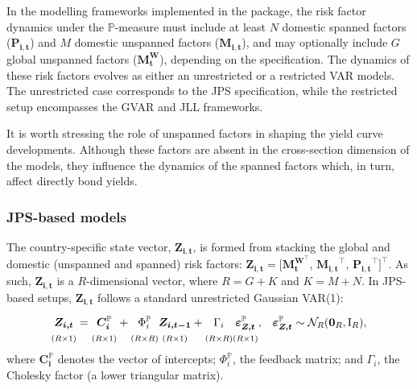 In the modelling frameworks implemented in the  package, the risk factor dynamics under the \(\mathbb{P}\)-measure must include at least \(N\) domestic spanned factors (\(\boldsymbol{P_{i,t}}\)) and \(M\) domestic unspanned factors (\(\boldsymbol{M_{i,t}}\)), and may optionally include \(G\) global unspanned factors (\(\boldsymbol{M_t^W}\)), depending on the specification. The dynamics of these risk factors evolves as either an unrestricted or a restricted VAR models. The unrestricted case corresponds to the JPS specification, while the restricted setup encompasses the GVAR and JLL frameworks.

It is worth stressing the role of unspanned factors in shaping the yield curve developments. Although these factors are absent in the cross-section dimension of the models, they influence the dynamics of the spanned factors which, in turn, affect directly bond yields.

\subsubsection{JPS-based models}\label{jps-based-models}

The country-specific state vector, \(\boldsymbol{Z_{i,t}}\), is formed from stacking the global and domestic (unspanned and spanned) risk factors: \(\boldsymbol{Z_{i,t}} = [\boldsymbol{M_t^{W^\top}}\), \(\boldsymbol{M_{i,t}}^\top\), \(\boldsymbol{P_{i,t}}^\top]^\top\). As such, \(\boldsymbol{Z_{i,t}}\) is a \(R\)-dimensional vector, where \(R =G + K\) and \(K = M + N\).
In JPS-based setups, \(\boldsymbol{Z_{i,t}}\) follows a standard unrestricted Gaussian VAR(1):
\begin{align}
    & \underset{(R \times 1)}{\vphantom{\Big|}
    \boldsymbol{Z_{i,t}}} =
    \underset{(R \times 1)}{\vphantom{\Big|}
     \boldsymbol{C_i^{\mathbb{P}}}} +
     \underset{(R \times R)}{\vphantom{\Big|}
     \Phi_i^{\mathbb{P}}}
     \underset{ (R \times 1)}{\vphantom{\Big|}
     \boldsymbol{Z_{i,t-1}}} +
     \underset{(R \times R)}{\vphantom{\Big|}
     \Gamma_i}
        \underset{(R \times 1)}{\vphantom{\Big|}
        \boldsymbol{\varepsilon_{Z,t}^{\mathbb{P}}}}\text{,}
        & \boldsymbol{\varepsilon_{Z,t}^{\mathbb{P}}} \sim
        {\mathcal{N}_R}(\boldsymbol{0}_R,\mathrm{I}_R)\text{,}%
    \label{eq:VARunspanned}
\end{align}
where \(\boldsymbol{C_i^{\mathbb{P}}}\) denotes the vector of intercepts; \(\Phi_i^{\mathbb{P}}\), the feedback matrix; and \(\Gamma_i\), the Cholesky factor (a lower triangular matrix).

